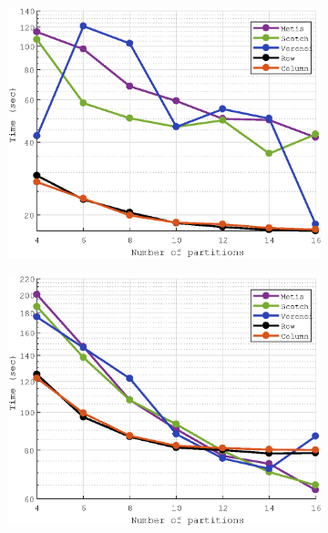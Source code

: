 \documentclass[a4paper,11pt]{article}
\begin{document}
\vspace*{-8mm}
\begin{figure}[H]\ContinuedFloat
	\begin{subfigure}[t]{0.45\textwidth}
		\centering
		\includegraphics[width=\textwidth]{robin_400x400_5_time.eps}
	\end{subfigure}
	\hfill
	\begin{subfigure}[t]{0.45\textwidth}
		\centering
		\includegraphics[width=\textwidth]{dirichlet_400x400_5_time.eps}
	\end{subfigure}
\end{figure}
\end{document}
